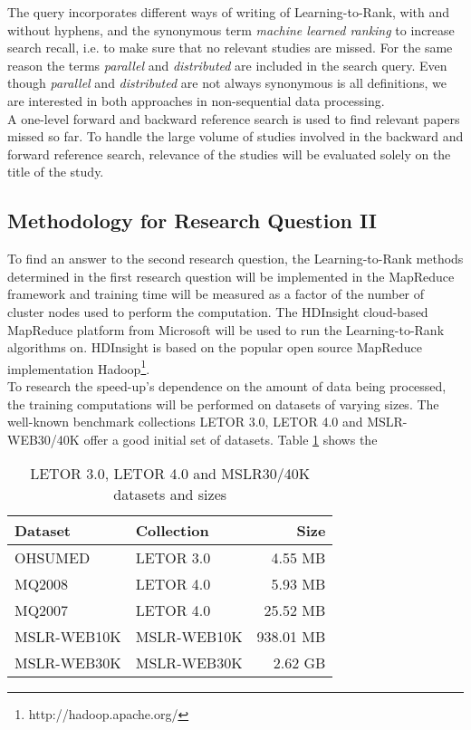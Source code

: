 The query incorporates different ways of writing of Learning-to-Rank, with and without hyphens, and the synonymous term \emph{machine learned ranking} to increase search recall, i.e. to make sure that no relevant studies are missed. For the same reason the terms \emph{parallel} and \emph{distributed} are included in the search query. Even though \emph{parallel} and \emph{distributed} are not always synonymous is all definitions, we are interested in both approaches in non-sequential data processing.\\

A one-level forward and backward reference search is used to find relevant papers missed so far. To handle the large volume of studies involved in the backward and forward reference search, relevance of the studies will be evaluated solely on the title of the study.\\

\subsection{Methodology for Research Question II}
To find an answer to the second research question, the Learning-to-Rank methods determined in the first research question will be implemented in the MapReduce framework and training time will be measured as a factor of the number of cluster nodes used to perform the computation. The HDInsight cloud-based MapReduce platform from Microsoft will be used to run the Learning-to-Rank algorithms on. HDInsight is based on the popular open source MapReduce implementation Hadoop\footnote{http://hadoop.apache.org/}.\\

To research the speed-up's dependence on the amount of data being processed, the training computations will be performed on datasets of varying sizes. The well-known benchmark collections LETOR 3.0, LETOR 4.0 and MSLR-WEB30/40K offer a good initial set of datasets. Table \ref{tbl:initial_datasets} shows the
\begin{table}[!h]
\centering
\begin{tabular}{p{3.4cm}p{3.4cm}r}\toprule
Dataset & Collection & Size \\
\midrule
OHSUMED     & LETOR 3.0       &   4.55 MB\\
MQ2008      & LETOR 4.0       &   5.93 MB\\
MQ2007      & LETOR 4.0       &  25.52 MB\\
MSLR-WEB10K & MSLR-WEB10K     & 938.01 MB\\
MSLR-WEB30K & MSLR-WEB30K     &   2.62 GB\\
\bottomrule
\end{tabular}
\caption{LETOR 3.0, LETOR 4.0 and MSLR30/40K datasets and sizes}
\label{tbl:initial_datasets}
\end{table}

